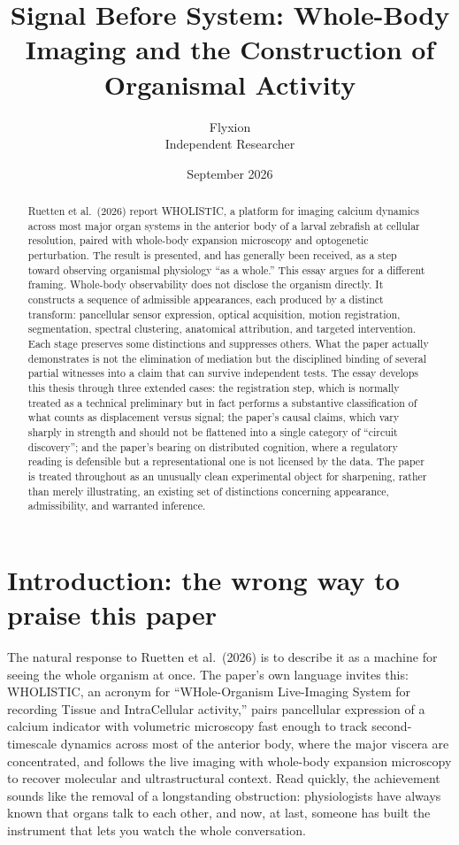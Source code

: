\documentclass[11pt]{article}
\title{\textbf{Signal Before System: Whole-Body Imaging and the Construction of Organismal Activity}}
\author{Flyxion \\ \small Independent Researcher}
\date{September 2026}
\begin{document}
\maketitle

\begin{abstract}
Ruetten et al.\ (2026) report WHOLISTIC, a platform for imaging calcium dynamics across most major organ systems in the anterior body of a larval zebrafish at cellular resolution, paired with whole-body expansion microscopy and optogenetic perturbation. The result is presented, and has generally been received, as a step toward observing organismal physiology ``as a whole.'' This essay argues for a different framing. Whole-body observability does not disclose the organism directly. It constructs a sequence of admissible appearances, each produced by a distinct transform: pancellular sensor expression, optical acquisition, motion registration, segmentation, spectral clustering, anatomical attribution, and targeted intervention. Each stage preserves some distinctions and suppresses others. What the paper actually demonstrates is not the elimination of mediation but the disciplined binding of several partial witnesses into a claim that can survive independent tests. The essay develops this thesis through three extended cases: the registration step, which is normally treated as a technical preliminary but in fact performs a substantive classification of what counts as displacement versus signal; the paper's causal claims, which vary sharply in strength and should not be flattened into a single category of ``circuit discovery''; and the paper's bearing on distributed cognition, where a regulatory reading is defensible but a representational one is not licensed by the data. The paper is treated throughout as an unusually clean experimental object for sharpening, rather than merely illustrating, an existing set of distinctions concerning appearance, admissibility, and warranted inference.
\end{abstract}

\section{Introduction: the wrong way to praise this paper}

The natural response to Ruetten et al.\ (2026) is to describe it as a machine for seeing the whole organism at once. The paper's own language invites this: WHOLISTIC, an acronym for ``WHole-Organism Live-Imaging System for recording Tissue and IntraCellular activity,'' pairs pancellular expression of a calcium indicator with volumetric microscopy fast enough to track second-timescale dynamics across most of the anterior body, where the major viscera are concentrated, and follows the live imaging with whole-body expansion microscopy to recover molecular and ultrastructural context. Read quickly, the achievement sounds like the removal of a longstanding obstruction: physiologists have always known that organs talk to each other, and now, at last, someone has built the instrument that lets you watch the whole conversation.
\end{document}
